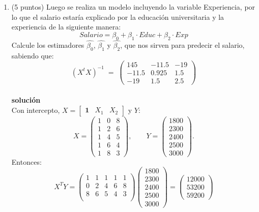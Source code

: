 \documentclass[10pt,a4paper]{article}
\begin{document}
\begin{enumerate}
\begin{enumerate}
    \item (5 puntos) Luego se realiza un modelo incluyendo la variable Experiencia, por lo que el salario estaría explicado por la educación universitaria y la experiencia de la siguiente manera:
    $$Salario = \beta_0 + \beta_1 \cdot Educ + \beta_2 \cdot Exp$$
    Calcule los estimadores $\hat{\beta_0}$, $\hat{\beta_1}$ y $\hat{\beta_2}$, que nos sirven para predecir el salario, sabiendo que:
    \[
(X^tX)^{-1} \;=\;
\begin{pmatrix}
145 & -11.5 & -19 \\
-11.5 & 0.925 & 1.5 \\
-19 & 1.5 & 2.5
\end{pmatrix}
\]
    \\
    \textbf{solución}
    \\
Con intercepto, $X=\begin{bmatrix}\mathbf{1}&X_1&X_2\end{bmatrix}$ y $Y$:
\[
X=
\begin{pmatrix}
1 & 0 & 8\\
1 & 2 & 6\\
1 & 4 & 5\\
1 & 6 & 4\\
1 & 8 & 3
\end{pmatrix},
\qquad
Y=
\begin{pmatrix}
1800\\2300\\2400\\2500\\3000
\end{pmatrix}.
\]
Entonces:
\[
X^TY=
\begin{pmatrix}
1 & 1 & 1 & 1 & 1\\
0 & 2 & 4 & 6 & 8\\
8 & 6 & 5 & 4 & 3\\
\end{pmatrix}
\begin{pmatrix}
1800\\2300\\2400\\2500\\3000
\end{pmatrix}=
\begin{pmatrix}
12000\\53200\\59200
\end{pmatrix}
\]


\end{enumerate}
\end{enumerate}
\end{document}
